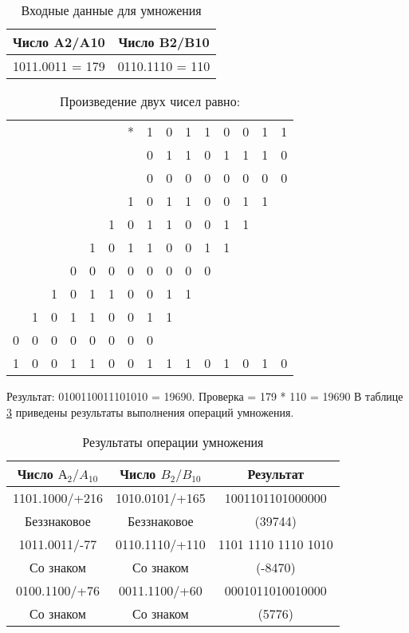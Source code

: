 \documentclass{bmstu}
\begin{document}
\begin{table}[h]
\caption{Входные данные для умножения}
	\label{table:mul_table_ex}
	\begin{tabular}{|c|c|}
	\hline
		Число A2/A10 & Число B2/B10 \\
	\hline
		1011.0011 = 179 & 0110.1110 = 110 \\
	\hline
	\end{tabular}
\end{table}


\begin{table}[h]
\caption{Произведение двух чисел равно:}
	\label{table:mul_table}
	\begin{tabular}{|ccccccccccccccc|}
	\hline
		&&&&&&*&1&0&1&1&0&0&1&1\\
		&&&&&&&0&1&1&0&1&1&1&0\\
	\cline{8-15}
		&&&&&&&0&0&0&0&0&0&0&0\\
		&&&&&&1&0&1&1&0&0&1&1&\\
		&&&&&1&0&1&1&0&0&1&1&&\\
		&&&&1&0&1&1&0&0&1&1&&&\\
		&&&0&0&0&0&0&0&0&0&&&&\\
		&&1&0&1&1&0&0&1&1&&&&&\\
		&1&0&1&1&0&0&1&1&&&&&&\\
		0&0&0&0&0&0&0&0&&&&&&&\\
	\hline
		1&0&0&1&1&0&0&1&1&1&0&1&0&1&0\\
	\hline
	\end{tabular}
\end{table}

Результат: 0100110011101010 = 19690. Проверка = 179 * 110 = 19690 \newline
В таблице \ref{table:mul_answer} приведены результаты выполнения операций умножения.

\begin{table}[H]
\caption{Результаты операции умножения}
	\label{table:mul_answer}
	\begin{tabular}{|c|c|c|}
	\hline
		Число $ \text{А}_2/A_{10}$ & Число $B_2/B_{10}$ & Результат \\
	\hline
		1101.1000/+216 & 1010.0101/+165 &1001101101000000 \\
		Беззнаковое & Беззнаковое & (39744) \\
	\hline
		1011.0011/-77 & 0110.1110/+110 & 1101 1110 1110 1010 \\
		Со знаком & Со знаком & (-8470) \\
	\hline
		0100.1100/+76 & 0011.1100/+60 & 0001011010010000\\
		Со знаком & Со знаком & (5776)\\
	\hline
	\end{tabular}
\end{table}
\end{document}
